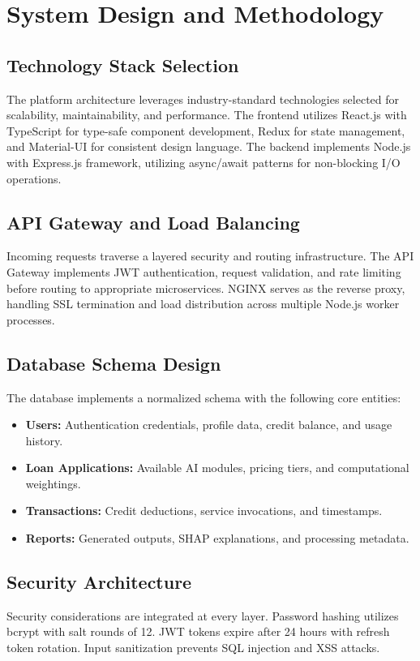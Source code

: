 \documentclass[conference]{IEEEtran}
\begin{document}
\section{System Design and Methodology}
\subsection{Technology Stack Selection}
The platform architecture leverages industry-standard technologies selected for scalability, maintainability, and performance. The frontend utilizes React.js with TypeScript for type-safe component development, Redux for state management, and Material-UI for consistent design language. The backend implements Node.js with Express.js framework, utilizing async/await patterns for non-blocking I/O operations.

\subsection{API Gateway and Load Balancing}
Incoming requests traverse a layered security and routing infrastructure. The API Gateway implements JWT authentication, request validation, and rate limiting before routing to appropriate microservices. NGINX serves as the reverse proxy, handling SSL termination and load distribution across multiple Node.js worker processes.

\subsection{Database Schema Design}
The database implements a normalized schema with the following core entities:
\begin{itemize}
    \item \textbf{Users:} Authentication credentials, profile data, credit balance, and usage history.
    \item \textbf{Loan Applications:} Available AI modules, pricing tiers, and computational weightings.
    \item \textbf{Transactions:} Credit deductions, service invocations, and timestamps.
    \item \textbf{Reports:} Generated outputs, SHAP explanations, and processing metadata.
\end{itemize}

\subsection{Security Architecture}
Security considerations are integrated at every layer. Password hashing utilizes bcrypt with salt rounds of 12. JWT tokens expire after 24 hours with refresh token rotation. Input sanitization prevents SQL injection and XSS attacks. 
\end{document}
